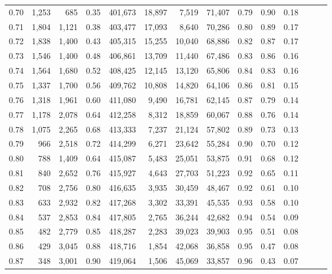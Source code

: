 \begin{tabular}{rrrrrrrrrrrrrr}
0.70 &   1,253 &    685 &  0.35 &  401,673 &   18,897 &   7,519 &  71,407 &  0.79 &  0.90 &      0.18 \\
0.71 &   1,804 &  1,121 &  0.38 &  403,477 &   17,093 &   8,640 &  70,286 &  0.80 &  0.89 &      0.17 \\
0.72 &   1,838 &  1,400 &  0.43 &  405,315 &   15,255 &  10,040 &  68,886 &  0.82 &  0.87 &      0.17 \\
0.73 &   1,546 &  1,400 &  0.48 &  406,861 &   13,709 &  11,440 &  67,486 &  0.83 &  0.86 &      0.16 \\
0.74 &   1,564 &  1,680 &  0.52 &  408,425 &   12,145 &  13,120 &  65,806 &  0.84 &  0.83 &      0.16 \\
0.75 &   1,337 &  1,700 &  0.56 &  409,762 &   10,808 &  14,820 &  64,106 &  0.86 &  0.81 &      0.15 \\
0.76 &   1,318 &  1,961 &  0.60 &  411,080 &    9,490 &  16,781 &  62,145 &  0.87 &  0.79 &      0.14 \\
0.77 &   1,178 &  2,078 &  0.64 &  412,258 &    8,312 &  18,859 &  60,067 &  0.88 &  0.76 &      0.14 \\
0.78 &   1,075 &  2,265 &  0.68 &  413,333 &    7,237 &  21,124 &  57,802 &  0.89 &  0.73 &      0.13 \\
0.79 &     966 &  2,518 &  0.72 &  414,299 &    6,271 &  23,642 &  55,284 &  0.90 &  0.70 &      0.12 \\
0.80 &     788 &  1,409 &  0.64 &  415,087 &    5,483 &  25,051 &  53,875 &  0.91 &  0.68 &      0.12 \\
0.81 &     840 &  2,652 &  0.76 &  415,927 &    4,643 &  27,703 &  51,223 &  0.92 &  0.65 &      0.11 \\
0.82 &     708 &  2,756 &  0.80 &  416,635 &    3,935 &  30,459 &  48,467 &  0.92 &  0.61 &      0.10 \\
0.83 &     633 &  2,932 &  0.82 &  417,268 &    3,302 &  33,391 &  45,535 &  0.93 &  0.58 &      0.10 \\
0.84 &     537 &  2,853 &  0.84 &  417,805 &    2,765 &  36,244 &  42,682 &  0.94 &  0.54 &      0.09 \\
0.85 &     482 &  2,779 &  0.85 &  418,287 &    2,283 &  39,023 &  39,903 &  0.95 &  0.51 &      0.08 \\
0.86 &     429 &  3,045 &  0.88 &  418,716 &    1,854 &  42,068 &  36,858 &  0.95 &  0.47 &      0.08 \\
0.87 &     348 &  3,001 &  0.90 &  419,064 &    1,506 &  45,069 &  33,857 &  0.96 &  0.43 &      0.07 \\

\end{tabular}
